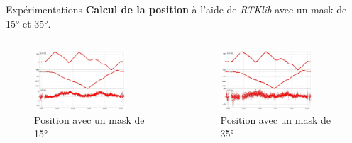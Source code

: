 \documentclass[xcolor=dvipsnames,envcountsect]{beamer}
\begin{document}
\begin{frame}{Expérimentations}
	\textbf{Calcul de la position} à l'aide de \textit{RTKlib} avec un mask de 15° et 35°.
	\newline
	\begin{columns}
		\begin{column}{0.5\textwidth}
			\begin{figure}
				\centering
				\includegraphics[width=0.8\textwidth]{./Figures/GDOP15.jpg}
				\caption{Position avec un mask de 15°}
			\end{figure}
		\end{column}

		\begin{column}{0.5\textwidth}
			\begin{figure}
				\centering
				\includegraphics[width=0.8\textwidth]{./Figures/GDOP35.jpg}
				\caption{Position avec un mask de 35°}
			\end{figure}
		\end{column}
	\end{columns}
\end{frame}
\end{document}

